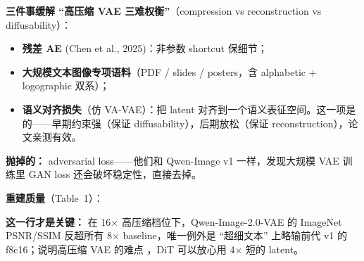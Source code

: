 \textbf{三件事缓解 ``高压缩 VAE 三难权衡''}（compression vs reconstruction vs diffusability）：

\begin{itemize}[leftmargin=1.5em]
  \item \textbf{残差 AE} (Chen et al., 2025)：非参数 shortcut 保细节；
  \item \textbf{大规模文本图像专项语料}（PDF / slides / posters，含 alphabetic + logographic 双系）；
  \item \textbf{语义对齐损失}（仿 VA-VAE）：把 latent 对齐到一个语义表征空间。这一项是  的——早期约束强（保证 diffusability），后期放松（保证 reconstruction），论文亲测有效。
\end{itemize}

\textbf{抛掉的：} adversarial loss——他们和 Qwen-Image v1 一样，发现大规模 VAE 训练里 GAN loss  还会破坏稳定性，直接去掉。

\textbf{重建质量}（Table~1）：

\begin{center}
\end{center}

\begin{summarybox}
\textbf{这一行才是关键：} 在 16$\times$ 高压缩档位下，Qwen-Image-2.0-VAE 的 ImageNet PSNR/SSIM 反超所有 8$\times$ baseline，唯一例外是 ``超细文本'' 上略输前代 v1 的 f8c16；说明高压缩 VAE 的难点 ，DiT 可以放心用 4$\times$ 短的 latent。
\end{summarybox}

